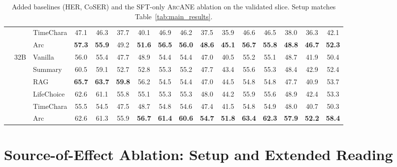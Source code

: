 \documentclass{llmxive}
\providecommand{\ours}{\textsc{ArcANE}}
\begin{document}
\begin{table}[!htbp]
\begin{tabular}{lllccccccccccccc}
 &  & TimeChara & 47.1 & 46.3 & 37.7 & 40.1 & 46.9 & 46.2 & 37.5 & 35.9 & 46.6 & 46.5 & 38.0 & 36.3 & 42.1 \\
 &  & \cellcolor{yellow!15} Arc & \cellcolor{yellow!15} \textbf{57.3} & \cellcolor{yellow!15} \textbf{55.9} & \cellcolor{yellow!15} 49.2 & \cellcolor{yellow!15} \textbf{51.6} & \cellcolor{yellow!15} \textbf{56.5} & \cellcolor{yellow!15} \textbf{56.0} & \cellcolor{yellow!15} \textbf{48.6} & \cellcolor{yellow!15} \textbf{45.1} & \cellcolor{yellow!15} \textbf{56.7} & \cellcolor{yellow!15} \textbf{55.8} & \cellcolor{yellow!15} \textbf{48.8} & \cellcolor{yellow!15} \textbf{46.7} & \cellcolor{yellow!15} \textbf{52.3} \\
\cmidrule(l){2-16}
 & \multirow[t]{6}{*}{32B} & Vanilla & 56.0 & 55.4 & 47.7 & 48.9 & 54.4 & 54.4 & 47.0 & 40.5 & 55.2 & 55.1 & 48.7 & 41.9 & 50.4 \\
 &  & Summary & 60.5 & 59.1 & 52.7 & 52.8 & 55.3 & 55.2 & 47.7 & 43.4 & 55.6 & 55.3 & 48.4 & 42.9 & 52.4 \\
 &  & RAG & \textbf{65.7} & \textbf{63.7} & \textbf{59.8} & 56.2 & 54.5 & 54.4 & 47.0 & 44.5 & 54.8 & 54.8 & 47.7 & 40.9 & 53.7 \\
 &  & LifeChoice & 62.6 & 61.1 & 55.8 & 55.1 & 55.3 & 55.3 & 48.0 & 44.2 & 55.9 & 55.6 & 48.9 & 42.4 & 53.3 \\
 &  & TimeChara & 55.5 & 54.5 & 47.5 & 48.7 & 54.8 & 54.6 & 47.4 & 41.5 & 54.8 & 54.9 & 48.0 & 40.7 & 50.3 \\
 &  & \cellcolor{yellow!15} Arc & \cellcolor{yellow!15} 62.6 & \cellcolor{yellow!15} 61.3 & \cellcolor{yellow!15} 55.9 & \cellcolor{yellow!15} \textbf{56.7} & \cellcolor{yellow!15} \textbf{61.4} & \cellcolor{yellow!15} \textbf{60.6} & \cellcolor{yellow!15} \textbf{54.7} & \cellcolor{yellow!15} \textbf{51.8} & \cellcolor{yellow!15} \textbf{63.4} & \cellcolor{yellow!15} \textbf{62.3} & \cellcolor{yellow!15} \textbf{57.9} & \cellcolor{yellow!15} \textbf{52.2} & \cellcolor{yellow!15} \textbf{58.4} \\
\bottomrule
\end{tabular}
\caption{Added baselines (HER, CoSER) and the SFT-only \ours{} ablation on the validated slice. Setup matches Table~\ref{tab:main_results}.}
\label{tab:main_results_added}
\end{table}


\section{Source-of-Effect Ablation: Setup and Extended Reading\label{app:arc-ablation-extra}}
\end{document}
